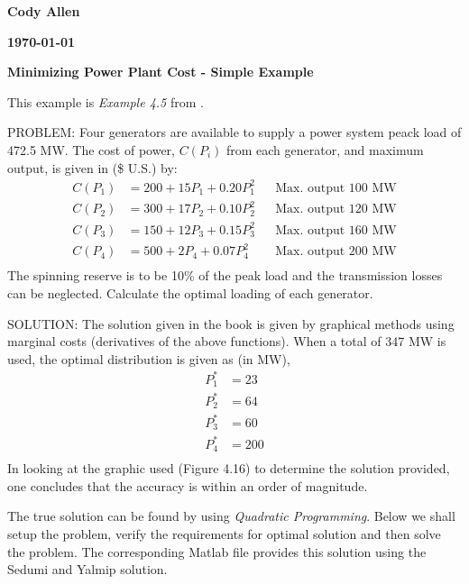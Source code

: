 \documentclass{article}
\begin{document}
\hfill \textbf{Cody Allen}

\hfill \textbf{\today}

\vspace{0.5cm}
\begin{center}
{\huge \textbf{Minimizing Power Plant Cost - Simple Example}}
\end{center}



\noindent
This example is \emph{Example 4.5} from \cite{EPS}.

PROBLEM:  Four generators are available to supply a power system peack load of 472.5 MW.  The cost of power, $C(P_i)$ from each generator, and maximum output, is given in (\$ U.S.) by:
\begin{align*}
C(P_1) &= 200 + 15P_1 + 0.20P_1^2 & & \text{Max. output 100 MW} \\
C(P_2) &= 300 + 17P_2 + 0.10P_2^2 & & \text{Max. output 120 MW} \\
C(P_3) &= 150 + 12P_3 + 0.15P_3^2 & & \text{Max. output 160 MW} \\
C(P_4) &= 500 + 2P_4 + 0.07P_4^2 & & \text{Max. output 200 MW} \\
\end{align*}
The spinning reserve is to be 10\% of the peak load and the transmission losses can be neglected.  Calculate the optimal loading of each generator.

\bigskip
\noindent
SOLUTION: The solution given in the book is given by graphical methods using marginal costs (derivatives of the above functions).  When a total of 347 MW is used, the optimal distribution is given as (in MW),
\begin{align*}
P_1^* &= 23 \\
P_2^* &= 64 \\
P_3^* &= 60 \\
P_4^* &= 200 \\
\end{align*}
In looking at the graphic used (Figure 4.16) to determine the solution provided, one concludes that the accuracy is within an order of magnitude.

The true solution can be found by using \emph{Quadratic Programming}.  Below we shall setup the problem, verify the requirements for optimal solution and then solve the problem.  The corresponding Matlab file provides this solution using the Sedumi and Yalmip solution.
\end{document}
